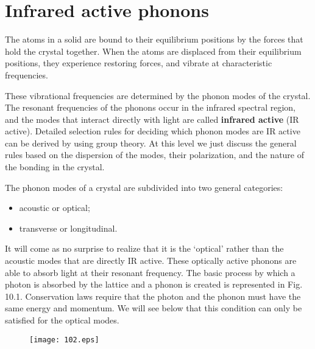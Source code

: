 \documentclass[12pt]{book}
\begin{document}
\section{Infrared active phonons}

The atoms in a solid are bound to their equilibrium positions by the forces that hold the crystal together. When the atoms are displaced from their equilibrium positions, they experience restoring forces, and vibrate at characteristic frequencies.

These vibrational frequencies are determined by the phonon modes of the crystal. The resonant frequencies of the phonons occur in the infrared spectral region, and the modes that interact directly with light are called \textbf{infrared active} (IR active). Detailed selection rules for deciding which phonon modes are IR active can be derived by using group theory. At this level we just discuss the general rules based on the dispersion of the modes, their polarization, and the nature of the bonding in the crystal.

The phonon modes of a crystal are subdivided into two general categories:
\begin{itemize}
  \item acoustic or optical;
  \item transverse or longitudinal.
\end{itemize}
It will come as no surprise to realize that it is the `optical' rather than the acoustic modes that are directly IR active. These optically active phonons are able to absorb light at their resonant frequency. The basic process by which a photon is absorbed by the lattice and a phonon is created is represented in Fig. 10.1. Conservation laws require that the photon and the phonon must have the same energy and momentum. We will see below that this condition can only be satisfied for the optical modes.

\begin{figure}
  \centering
  \texttt{[image: 102.eps]}\label{fig:10.2}\\
\end{figure}
\end{document}
